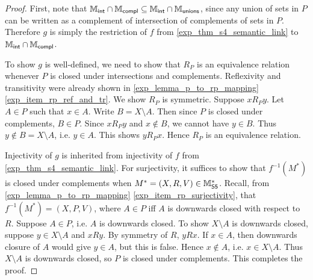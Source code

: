\begin{proof}
    First, note that $\mathbb{M}_{\mathsf{int}} \cap \mathbb{M}_{\mathsf{compl}} \subseteq \mathbb{M}_{\mathsf{int}} \cap
    \mathbb{M}_{\mathsf{unions}}$, since any union of sets in $P$ can be written as a
    complement of intersection of complements of sets in $P$. Therefore
    $g$ is simply the restriction of $f$ from
    \cref{exp_thm_s4_semantic_link} to $\mathbb{M}_{\mathsf{int}} \cap \mathbb{M}_{\mathsf{compl}}$.

    To show $g$ is well-defined, we need to show that $R_P$ is an equivalence
    relation whenever $P$ is closed under intersections and complements.
    Reflexivity and transitivity were already shown in
    \cref{exp_lemma_p_to_rp_mapping} \cref{exp_item_rp_ref_and_tr}. We show $R_P$ is
    symmetric.  Suppose $x{R_P}y$. Let $A \in P$ such that $x \in A$.  Write $B
    = X \setminus A$. Then since $P$ is closed under complements, $B \in P$.
    Since $x{R_P}y$ and $x \notin B$, we cannot have $y \in B$. Thus $y \notin
    B = X \setminus A$, i.e. $y \in A$. This shows $y{R_P}x$. Hence $R_P$ is an
    equivalence relation.

    Injectivity of $g$ is inherited from injectivity of $f$ from
    \cref{exp_thm_s4_semantic_link}. For surjectivity, it suffices to show that
    $f^{-1}(M^*)$ is closed under complements when $M^* = (X, R, V) \in
    \mathbb{M}^*_{\mathsf{S5}}$. Recall, from \cref{exp_lemma_p_to_rp_mapping}
    \cref{exp_item_rp_surjectivity}, that $f^{-1}(M^*) = (X, P, V)$, where $A
    \in P$ iff $A$ is downwards closed with respect to $R$. Suppose $A \in P$,
    i.e. $A$ is downwards closed. To show $X \setminus A$ is downwards closed,
    suppose $y \in X \setminus A$ and $xRy$.  By symmetry of $R$, $yRx$. If $x
    \in A$, then downwards closure of $A$ would give $y \in A$, but this is
    false. Hence $x \notin A$, i.e. $x \in X \setminus A$. Thus $X \setminus A$
    is downwards closed, so $P$ is closed under complements. This completes the
    proof.
\end{proof}

